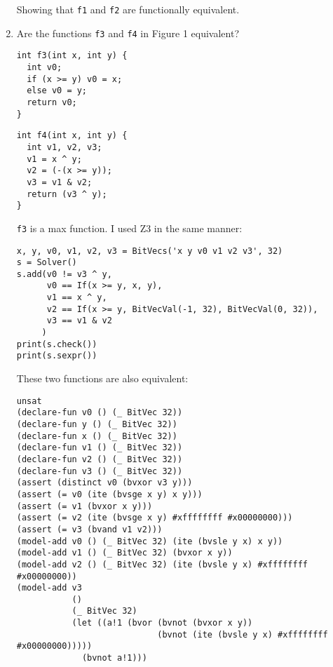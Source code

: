 \begin{enumerate}[label=(\alph*)]
    Showing that \texttt{f1} and \texttt{f2} are functionally equivalent.

  \item {\color{blue}Are the functions \texttt{f3} and \texttt{f4} in Figure 1 equivalent?}

    \bigskip
    \noindent
    \begin{minipage}[c]{0.4\textwidth}
      \begin{verbatim}
int f3(int x, int y) {
  int v0;
  if (x >= y) v0 = x;
  else v0 = y;
  return v0;
}
      \end{verbatim}
    \end{minipage}
    \hfill
    \begin{minipage}[c]{0.4\textwidth}
      \begin{verbatim}
int f4(int x, int y) {
  int v1, v2, v3;
  v1 = x ^ y;
  v2 = (-(x >= y));
  v3 = v1 & v2;
  return (v3 ^ y);
}
      \end{verbatim}
    \end{minipage}
    \bigskip

    \texttt{f3} is a max function. I used Z3 in the same manner:

    \begin{verbatim}
x, y, v0, v1, v2, v3 = BitVecs('x y v0 v1 v2 v3', 32)
s = Solver()
s.add(v0 != v3 ^ y,
      v0 == If(x >= y, x, y),
      v1 == x ^ y,
      v2 == If(x >= y, BitVecVal(-1, 32), BitVecVal(0, 32)),
      v3 == v1 & v2
     )
print(s.check())
print(s.sexpr())
    \end{verbatim}

    These two functions are also equivalent:
    \begin{verbatim}
unsat
(declare-fun v0 () (_ BitVec 32))
(declare-fun y () (_ BitVec 32))
(declare-fun x () (_ BitVec 32))
(declare-fun v1 () (_ BitVec 32))
(declare-fun v2 () (_ BitVec 32))
(declare-fun v3 () (_ BitVec 32))
(assert (distinct v0 (bvxor v3 y)))
(assert (= v0 (ite (bvsge x y) x y)))
(assert (= v1 (bvxor x y)))
(assert (= v2 (ite (bvsge x y) #xffffffff #x00000000)))
(assert (= v3 (bvand v1 v2)))
(model-add v0 () (_ BitVec 32) (ite (bvsle y x) x y))
(model-add v1 () (_ BitVec 32) (bvxor x y))
(model-add v2 () (_ BitVec 32) (ite (bvsle y x) #xffffffff #x00000000))
(model-add v3
           ()
           (_ BitVec 32)
           (let ((a!1 (bvor (bvnot (bvxor x y))
                            (bvnot (ite (bvsle y x) #xffffffff #x00000000)))))
             (bvnot a!1)))
    \end{verbatim}
\end{enumerate}


